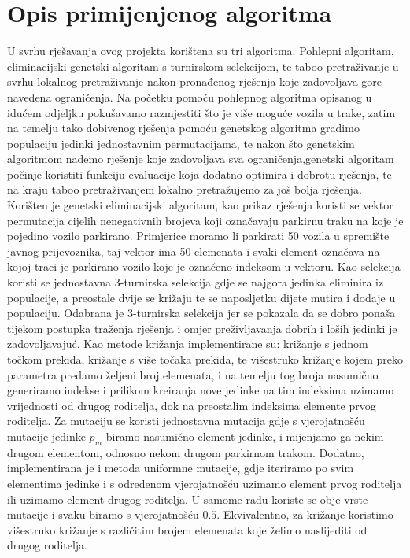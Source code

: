 \documentclass[11pt]{article}
\begin{document}
\section{Opis primijenjenog algoritma}
U svrhu rješavanja ovog projekta korištena su tri algoritma. Pohlepni algoritam, eliminacijski genetski algoritam s turnirskom selekcijom, te taboo pretraživanje u svrhu lokalnog pretraživanje nakon pronađenog rješenja koje zadovoljava gore navedena ograničenja. Na početku pomoću pohlepnog algoritma opisanog u idućem odjeljku pokušavamo razmjestiti što je više moguće vozila u trake, zatim na temelju tako dobivenog rješenja pomoću genetskog algoritma gradimo populaciju jedinki jednostavnim permutacijama, te nakon što genetskim algoritmom nađemo rješenje koje zadovoljava sva ograničenja,genetski algoritam počinje koristiti funkciju evaluacije koja dodatno optimira i dobrotu rješenja, te na kraju taboo pretraživanjem lokalno pretražujemo za još bolja rješenja. Korišten je genetski eliminacijski algoritam, kao prikaz rješenja koristi se vektor permutacija cijelih nenegativnih brojeva koji označavaju parkirnu traku na koje je pojedino vozilo parkirano. Primjerice moramo li parkirati 50 vozila u spremište javnog prijevoznika, taj vektor ima 50 elemenata i svaki element označava na kojoj traci je parkirano vozilo koje je označeno indeksom u vektoru. Kao selekcija koristi se jednostavna 3-turnirska selekcija gdje se najgora jedinka eliminira iz populacije, a preostale dvije se križaju te se naposljetku dijete mutira i dodaje u populaciju. Odabrana je 3-turnirska selekcija jer se pokazala da se dobro ponaša tijekom postupka traženja rješenja i omjer preživljavanja dobrih i loših jedinki je zadovoljavajuć. Kao metode križanja implementirane su: križanje s jednom točkom prekida, križanje s više točaka prekida, te višestruko križanje kojem preko parametra predamo željeni broj elemenata, i na temelju tog broja nasumično generiramo indekse i prilikom kreiranja nove jedinke na tim indeksima uzimamo vrijednosti od drugog roditelja, dok na preostalim indeksima elemente prvog roditelja. Za mutaciju se koristi jednostavna mutacija gdje s vjerojatnošću mutacije jedinke $p_m$ biramo nasumično element jedinke, i mijenjamo ga nekim drugom elementom, odnosno nekom drugom parkirnom trakom. Dodatno, implementirana je i metoda uniformne mutacije, gdje iteriramo po svim elementima jedinke i s određenom vjerojatnošću uzimamo element prvog roditelja ili uzimamo element drugog roditelja. U samome radu koriste se obje vrste mutacije i svaku biramo s vjerojatnošću $0.5$. Ekvivalentno, za križanje koristimo višestruko križanje s različitim brojem elemenata koje želimo naslijediti od drugog roditelja.
\end{document}
